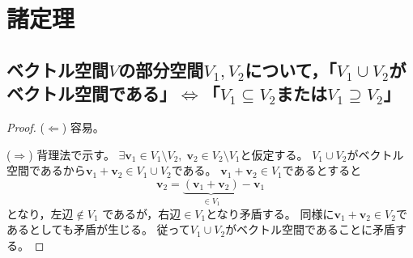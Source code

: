     \section{諸定理}
        \subsection{ベクトル空間\texorpdfstring{$V$}{V}の部分空間\texorpdfstring{$V_1,V_2$}{V1, V2}について，「\texorpdfstring{$V_1\cup V_2$}{V1∪V2}がベクトル空間である」\texorpdfstring{$\iff$}{⇔}「\texorpdfstring{$V_1\subseteq V_2$}{V1⊆V2}または\texorpdfstring{$V_1 \supseteq V_2$}{V1⊇V2}」}
            \begin{proof}
                \quad\par
                ($\Leftarrow$) 容易。
                \par
                ($\Rightarrow$) 背理法で示す。
                $\exists \bm{v}_1\in V_1\setminus V_2, \;\bm{v}_2\in V_2\setminus V_1$と仮定する。
                $V_1\cup V_2$がベクトル空間であるから$\bm{v}_1 + \bm{v}_2 \in V_1\cup V_2$である。
                $\bm{v}_1 + \bm{v}_2 \in V_1$であるとすると
                \[ \bm{v}_2 = \underbrace{(\bm{v}_1 + \bm{v}_2)}_{\in V_1} - \bm{v}_1 \]
                となり，左辺$\notin V_1$ であるが，右辺$\in V_1$となり矛盾する。
                同様に$\bm{v}_1 + \bm{v}_2 \in V_2$であるとしても矛盾が生じる。
                従って$V_1\cup V_2$がベクトル空間であることに矛盾する。
            \end{proof}
